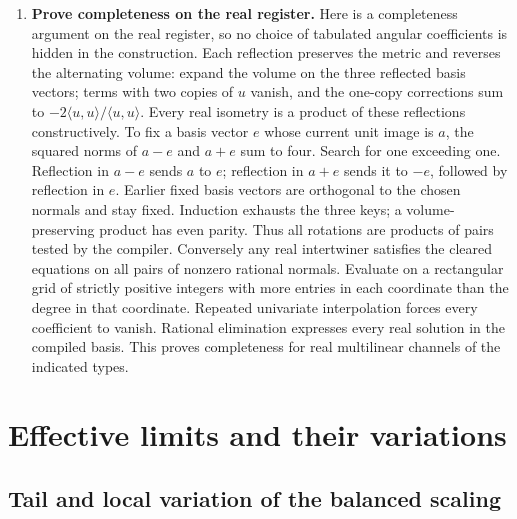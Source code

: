 \documentclass[11pt,a4paper]{article}
\theoremstyle{definition}
\theoremstyle{remark}\newaliascnt{remark}{theorem}
\numberwithin{equation}{section}
\begin{document}
\begin{enumerate}[titledsteps]
    \item \textbf{Prove completeness on the real register.} Here is a completeness argument on the real register, so no choice of tabulated angular coefficients is hidden in the construction. Each reflection preserves the metric and reverses the alternating volume: expand the volume on the three reflected basis vectors; terms with two copies of $u$ vanish, and the one-copy corrections sum to $-2\langle u,u\rangle/\langle u,u\rangle$. Every real isometry is a product of these reflections constructively. To fix a basis vector $e$ whose current unit image is $a$, the squared norms of $a-e$ and $a+e$ sum to four. Search for one exceeding one. Reflection in $a-e$ sends $a$ to $e$; reflection in $a+e$ sends it to $-e$, followed by reflection in $e$. Earlier fixed basis vectors are orthogonal to the chosen normals and stay fixed. Induction exhausts the three keys; a volume-preserving product has even parity. Thus all rotations are products of pairs tested by the compiler. Conversely any real intertwiner satisfies the cleared equations on all pairs of nonzero rational normals. Evaluate on a rectangular grid of strictly positive integers with more entries in each coordinate than the degree in that coordinate. Repeated univariate interpolation forces every coefficient to vanish. Rational elimination expresses every real solution in the compiled basis. This proves completeness for real multilinear channels of the indicated types.
\end{enumerate}

\section{Effective limits and their variations}\label{app:limits}

\subsection{Tail and local variation of the balanced scaling}
\end{document}
